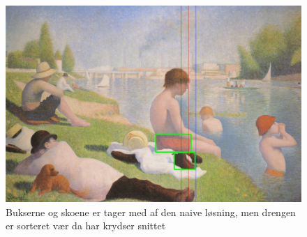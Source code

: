 \begin{figure}[h!!]
	\begin{center}
		\includegraphics[scale=0.3,angle=0]{afsnit/afprovning/billeder/naive_losning/naiv_mfarver_mdetaljer.png}
	\end{center}
	\caption[]{Bukserne og skoene er tager med af den naive løsning, men drengen er sorteret vær da har krydser snittet}
	\label{naiv_mfarver_mdetaljer}
\end{figure}

